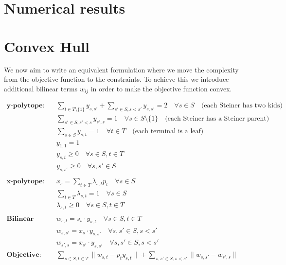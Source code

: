 \documentclass[11pt,reqno,a4paper]{amsart}
\numberwithin{equation}{section}
\theoremstyle{mytheorem}
\theoremstyle{myremark}
\theoremstyle{myparagraph}
\begin{document}
    \section{Numerical results}


    \section{Convex Hull}

    We now aim to write an equivalent formulation where we move the complexity from the objective function to the constraints.
    To achieve this we introduce additional bilinear terms $w_{ij}$ in order to make the objective function convex.

    \begin{align}
        \textbf{y-polytope:} \quad & \sum_{t \in T \setminus \{1\}} y_{s,s'} + \sum_{s' \in S, s < s'} y_{s,s'} = 2 \quad \forall s \in S \quad \text{(each Steiner has two kids)} \\
        & \sum_{s' \in S, s' < s} y_{s',s} = 1 \quad \forall s \in S \setminus \{1\} \quad \text{(each Steiner has a Steiner parent)} \\
        & \sum_{s \in S} y_{s,t} = 1 \quad \forall t \in T \quad \text{(each terminal is a leaf)} \\
        & y_{1,1} = 1 \\
        & y_{s,t} \geq 0 \quad \forall s \in S, t \in T \\
        & y_{s,s'} \geq 0 \quad \forall s, s' \in S \\
        \\
        \textbf{x-polytope:} \quad & x_s = \sum_{t \in T} \lambda_{s,t} p_t \quad \forall s \in S \\
        & \sum_{t \in T} \lambda_{s,t} = 1 \quad \forall s \in S \\
        & \lambda_{s,t} \geq 0 \quad \forall s \in S, t \in T \\
        \\
        \textbf{Bilinear terms:} \quad & w_{s,t} = s_s \cdot y_{s,t} \quad \forall s \in S, t \in T \\
        & w_{s,s'} = x_s \cdot y_{s,s'} \quad \forall s, s' \in S, s < s' \\
        & w_{s',s} = x_{s'} \cdot y_{s,s'} \quad \forall s, s' \in S, s < s' \\
        \textbf{Objective:} \quad & \sum_{s \in S, t \in T} \| w_{s,t} - p_t y_{s,t} \| + \sum_{s, s' \in S, s < s'} \| w_{s,s'} - w_{s',s} \| \\
    \end{align}
\end{document}

